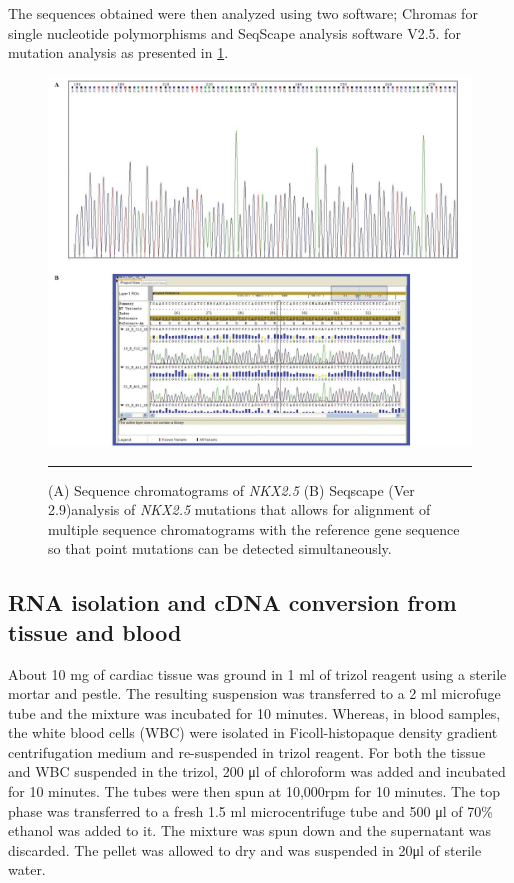 The sequences obtained were then analyzed using two software; Chromas for single nucleotide polymorphisms and SeqScape analysis software V2.5. for mutation analysis as presented in \cref{fig:2_8chromatogram}. 

\begin{figure}[!tb]
\centering
\includegraphics[width=\linewidth]{Figures/2_8chromatogram.pdf} 
\rule{35em}{0.5pt}
\caption{(A) Sequence chromatograms of \textit{NKX2.5} (B) Seqscape (Ver 2.9)analysis of \textit{NKX2.5} mutations  that allows for alignment of multiple sequence chromatograms  with the reference gene sequence so that point mutations can be detected simultaneously.}
\label{fig:2_8chromatogram}
\end{figure}

\subsection{RNA isolation and cDNA conversion from tissue and blood} 
About 10 mg of cardiac tissue was ground in 1 ml of trizol reagent using a sterile mortar and pestle. The resulting suspension was transferred to a 2 ml microfuge tube and the mixture was incubated for 10 minutes. Whereas, in blood samples, the white blood cells (WBC) were isolated in Ficoll-histopaque density gradient centrifugation medium  and  re-suspended in trizol reagent. For both the tissue and WBC suspended in the trizol, 200 μl of chloroform was added and incubated for 10 minutes. The tubes were then spun at 10,000rpm for 10 minutes. The top phase was transferred to a fresh 1.5 ml microcentrifuge tube and 500 μl of 70\% ethanol was added to it. The mixture was spun down and the supernatant was discarded. The pellet was allowed to dry and was suspended in 20μl of sterile water. 

